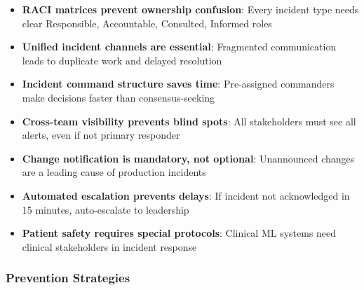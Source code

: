 \begin{itemize}
    \item \textbf{RACI matrices prevent ownership confusion}: Every incident type needs clear Responsible, Accountable, Consulted, Informed roles
    \item \textbf{Unified incident channels are essential}: Fragmented communication leads to duplicate work and delayed resolution
    \item \textbf{Incident command structure saves time}: Pre-assigned commanders make decisions faster than consensus-seeking
    \item \textbf{Cross-team visibility prevents blind spots}: All stakeholders must see all alerts, even if not primary responder
    \item \textbf{Change notification is mandatory, not optional}: Unannounced changes are a leading cause of production incidents
    \item \textbf{Automated escalation prevents delays}: If incident not acknowledged in 15 minutes, auto-escalate to leadership
    \item \textbf{Patient safety requires special protocols}: Clinical ML systems need clinical stakeholders in incident response
\end{itemize}

\subsubsection{Prevention Strategies}

